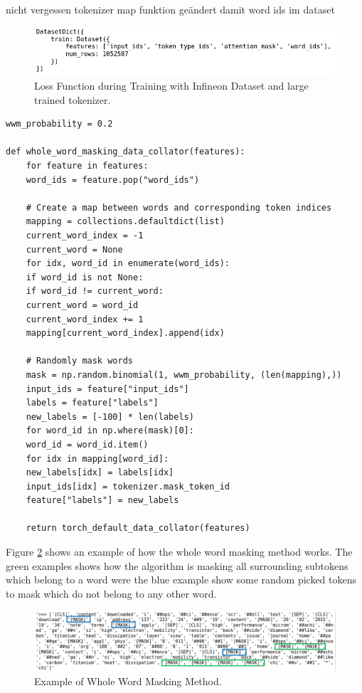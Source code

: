 \alert{nicht vergessen tokenizer map funktion geändert damit word ids im dataset}
\begin{figure}[H]
	\centering
	\includegraphics[width=1\textwidth]{figures/tok_dataset_wordids.png}
	\caption{Loss Function during Training with Infineon Dataset and large trained tokenizer.}
	\label{fig:data_wordids}
\end{figure}

\begin{code}
	\label{code:wwm}
\begin{verbatim}
wwm_probability = 0.2

def whole_word_masking_data_collator(features):
	for feature in features:
	word_ids = feature.pop("word_ids")
	
	# Create a map between words and corresponding token indices
	mapping = collections.defaultdict(list)
	current_word_index = -1
	current_word = None
	for idx, word_id in enumerate(word_ids):
	if word_id is not None:
	if word_id != current_word:
	current_word = word_id
	current_word_index += 1
	mapping[current_word_index].append(idx)
	
	# Randomly mask words
	mask = np.random.binomial(1, wwm_probability, (len(mapping),))
	input_ids = feature["input_ids"]
	labels = feature["labels"]
	new_labels = [-100] * len(labels)
	for word_id in np.where(mask)[0]:
	word_id = word_id.item()
	for idx in mapping[word_id]:
	new_labels[idx] = labels[idx]
	input_ids[idx] = tokenizer.mask_token_id
	feature["labels"] = new_labels
	
	return torch_default_data_collator(features)
\end{verbatim}
\end{code}

\alert{Figure \ref{fig:wwm_ex} shows an example of how the whole word masking method works. The green examples shows how the algorithm is masking all surrounding subtokens which belong to a word were the blue example show some random picked tokens to mask which do not belong to any other word.}

\begin{figure}[H]
 	\centering
 	\includegraphics[width=1\textwidth]{figures/wwm_example.png}
 	\caption{Example of Whole Word Masking Method.}
 	\label{fig:wwm_ex}
 \end{figure}

